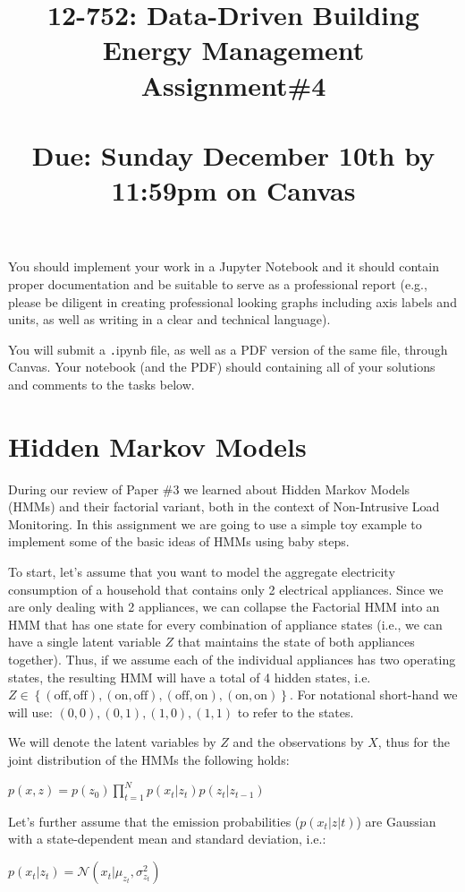 \documentclass[times, 12pt, singlecolumn]{article}
\title{12-752: Data-Driven Building Energy Management\\ Assignment\#4\\\quad \\Due: Sunday December 10th by 11:59pm on Canvas}
\begin{document}
\maketitle
You should implement your work in a Jupyter Notebook and it should contain proper documentation and be suitable to serve as a professional report (e.g., please be diligent in creating professional looking graphs including axis labels and units, as well as writing in a clear and technical language).

You will submit a {\texttt .ipynb} file, as well as a PDF version of the same file, through Canvas. Your notebook (and the PDF) should containing all of your solutions and comments to the tasks below.

\section{Hidden Markov Models}
During our review of Paper \#3 we learned about Hidden Markov Models (HMMs) and their factorial variant, both in the context of Non-Intrusive Load Monitoring. In this assignment we are going to use a simple toy example to implement some of the basic ideas of HMMs using baby steps.

To start, let's assume that you want to model the aggregate electricity consumption of a household that contains only 2 electrical appliances. Since we are only dealing with 2 appliances, we can collapse the Factorial HMM into an HMM that has one state for every combination of appliance states (i.e., we can have a single latent variable $Z$ that maintains the state of both appliances together). Thus, if we assume each of the individual appliances has two operating states, the resulting HMM will have a total of 4 hidden states, i.e. $Z \in \left\{(\text{off},\text{off}), (\text{on},\text{off}), (\text{off},\text{on}), (\text{on}, \text{on})\right\}$. For notational short-hand we will use: $(0,0), (0,1), (1,0), (1,1)$ to refer to the states.

We will denote the latent variables by $Z$ and the observations by $X$, thus for the joint distribution of the HMMs the following holds: 

$p(x,z) = p(z_0) \prod_{t=1}^N p(x_t|z_t) p(z_t | z_{t-1})$

Let's further assume that the emission probabilities ($p(x_t|z|t)$) are Gaussian with a state-dependent mean and standard deviation, i.e.:

$p(x_t | z_t) = \mathcal{N}(x_t | \mu_{z_t}, \sigma^2_{z_t})$
\end{document}
